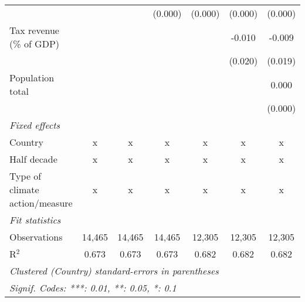 \begin{tabular}{lcccccc}
                                                                                  &              &               & (0.000)       & (0.000)      & (0.000)      & (0.000)\\   
   Tax revenue (\% of GDP)                                                        &              &               &               &              & -0.010       & -0.009\\   
                                                                                  &              &               &               &              & (0.020)      & (0.019)\\   
   Population total                                                               &              &               &               &              &              & 0.000\\   
                                                                                  &              &               &               &              &              & (0.000)\\   
   \emph{Fixed effects}\\
   Country                                                                        & x            & x             & x             & x            & x            & x\\  
   Half decade                                                                    & x            & x             & x             & x            & x            & x\\  
   Type of climate action/measure                                                 & x            & x             & x             & x            & x            & x\\  
   \midrule \emph{Fit statistics}\\
   Observations                                                                   & 14,465       & 14,465        & 14,465        & 12,305       & 12,305       & 12,305\\  
   R$^2$                                                                          & 0.673        & 0.673         & 0.673         & 0.682        & 0.682        & 0.682\\  
   \midrule
   \multicolumn{7}{l}{\emph{Clustered (Country) standard-errors in parentheses}}\\
   \multicolumn{7}{l}{\emph{Signif. Codes: ***: 0.01, **: 0.05, *: 0.1}}\\
\end{tabular}
\par\endgroup


